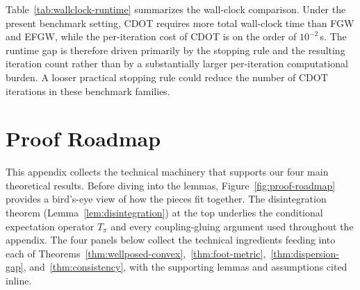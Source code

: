 \documentclass{article}
\theoremstyle{plain}
\theoremstyle{definition}
\theoremstyle{remark}
\begin{document}
Table~\ref{tab:wallclock-runtime} summarizes the wall-clock comparison. Under the present benchmark setting, CDOT requires more total wall-clock time than FGW and EFGW, while the per-iteration cost of CDOT is on the order of $10^{-2}$\,s. The runtime gap is therefore driven primarily by the stopping rule and the resulting iteration count rather than by a substantially larger per-iteration computational burden. A looser practical stopping rule could reduce the number of CDOT iterations in these benchmark families.

\section{Proof Roadmap}\label{App:proof-roadmap}
This appendix collects the technical machinery that supports our four main theoretical results. Before diving into the lemmas, Figure~\ref{fig:proof-roadmap} provides a bird's-eye view of how the pieces fit together. The disintegration theorem (Lemma~\ref{lem:disintegration}) at the top underlies the conditional expectation operator $T_\pi$ and every coupling-gluing argument used throughout the appendix. The four panels below collect the technical ingredients feeding into each of Theorems~\ref{thm:wellposed-convex},~\ref{thm:foot-metric},~\ref{thm:dispersion-gap}, and~\ref{thm:consistency}, with the supporting lemmas and assumptions cited inline.
\end{document}
